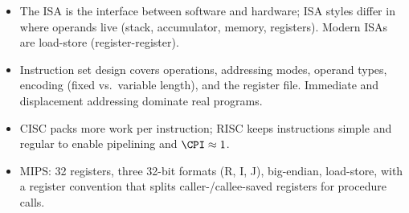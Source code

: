 \begin{itemize}[leftmargin=*]
  \item The ISA is the interface between software and hardware; ISA styles
  differ in where operands live (stack, accumulator, memory, registers).
  Modern ISAs are load-store (register-register).
  \item Instruction set design covers operations, addressing modes, operand
  types, encoding (fixed vs.\ variable length), and the register file.
  Immediate and displacement addressing dominate real programs.
  \item CISC packs more work per instruction; RISC keeps instructions simple
  and regular to enable pipelining and $\CPI\approx 1$.
  \item MIPS: 32 registers, three 32-bit formats (R, I, J), big-endian,
  load-store, with a register convention that splits caller-/callee-saved
  registers for procedure calls.
\end{itemize}
